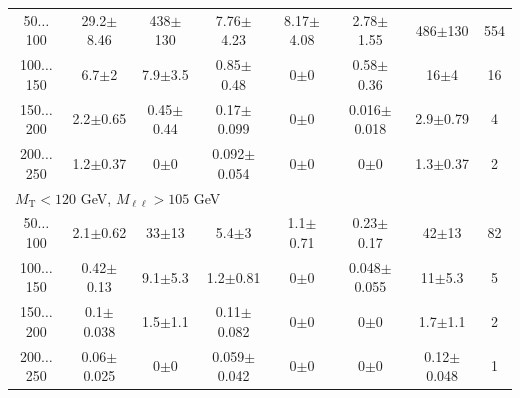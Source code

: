 \begin{table}
\begin{center}
\begin{tabular}{| c | c c c c c c c | }
50$\dots$100&29.2$\pm$8.46&438$\pm$130&7.76$\pm$4.23&8.17$\pm$4.08&2.78$\pm$1.55&486$\pm$130&554\\
100$\dots$150&6.7$\pm$2&7.9$\pm$3.5&0.85$\pm$0.48&0$\pm$0&0.58$\pm$0.36&16$\pm$4&16\\
150$\dots$200&2.2$\pm$0.65&0.45$\pm$0.44&0.17$\pm$0.099&0$\pm$0&0.016$\pm$0.018&2.9$\pm$0.79&4\\
200$\dots$250&1.2$\pm$0.37&0$\pm$0&0.092$\pm$0.054&0$\pm$0&0$\pm$0&1.3$\pm$0.37&2\\
\hline\hline
\multicolumn{8}{l}{$M_{\text{T}} < 120$ GeV, $M_{\ell\ell} > 105$ GeV}\\\hline\hline
50$\dots$100&2.1$\pm$0.62&33$\pm$13&5.4$\pm$3&1.1$\pm$0.71&0.23$\pm$0.17&42$\pm$13&82\\
100$\dots$150&0.42$\pm$0.13&9.1$\pm$5.3&1.2$\pm$0.81&0$\pm$0&0.048$\pm$0.055&11$\pm$5.3&5\\
150$\dots$200&0.1$\pm$0.038&1.5$\pm$1.1&0.11$\pm$0.082&0$\pm$0&0$\pm$0&1.7$\pm$1.1&2\\
200$\dots$250&0.06$\pm$0.025&0$\pm$0&0.059$\pm$0.042&0$\pm$0&0$\pm$0&0.12$\pm$0.048&1\\
\hline\hline
\end{tabular}
\end{center}
\end{table}
\clearpage